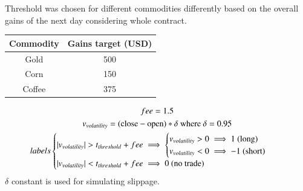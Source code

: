 \documentclass[final,2p]{elsarticle}
\begin{document}
Threshold was chosen for different commodities differently based on the overall gains of the next day considering whole contract.

\begin{center}
\begin{tabular}{cc}
    \centering
    Commodity & Gains target (USD) \\
    \hline
    Gold & 500 \\
    Corn & 150 \\
    Coffee & 375 \\
\end{tabular}
\end{center}

\begin{gather}
    fee = 1.5 \\
    v_{volatility} = (\textup{close} - \textup{open})*\delta \textup{ where } \delta = 0.95 \\
    labels
    \begin{cases}
        | v_{volatility} | > t_{threshold} + fee \implies
        \begin{cases}
            v_{volatility} > 0 \implies 1 \textup{ (long)} \\
            v_{volatility} < 0 \implies -1 \textup{ (short)} \\
        \end{cases}\\
        | v_{volatility} | < t_{threshold} + fee \implies 0 \textup{ (no trade)}
    \end{cases}
\end{gather}
$\delta$ constant is used for simulating slippage.
\end{document}
